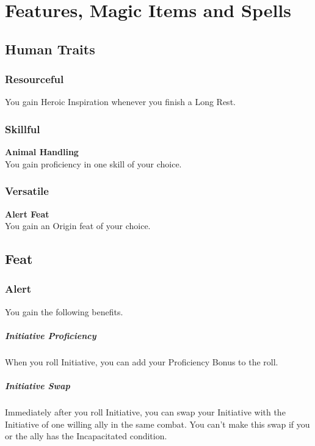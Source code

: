 \documentclass[letterpaper,openany,oneside,twocolumn]{book}
\begin{document}
\onecolumn


\rendercharactersheet

\renderbackgroundsheet

\renderspellsheet

\renderoldspellsheet


\restoregeometry
\twocolumn

\chapter*{Features, Magic Items and Spells}

\section*{Human Traits}
\subsection*{Resourceful}
You gain Heroic Inspiration whenever you finish a Long Rest. 
\subsection*{Skillful}
\textbf{Animal Handling}\\
You gain proficiency in one skill of your choice.
\subsection*{Versatile}
\textbf{Alert Feat}\\
You gain an Origin feat of your choice.

\section*{Feat}
\subsection*{Alert}
You gain the following benefits.
\paragraph*{Initiative Proficiency} When you roll Initiative, you can add your Proficiency Bonus to the roll.
\paragraph*{Initiative Swap} Immediately after you roll Initiative, you can swap your Initiative with the Initiative of one willing ally in the same combat. You can't make this swap if you or the ally has the Incapacitated condition. 
\end{document}
